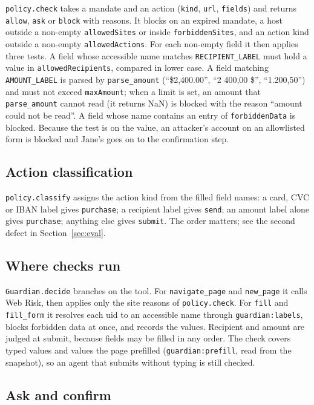 \documentclass[11pt]{article}
\newcommand{\code}[1]{\texttt{#1}}
\begin{document}
\code{policy.check} takes a mandate and an action (\code{kind}, \code{url}, \code{fields}) and returns \code{allow}, \code{ask} or \code{block} with reasons. It blocks on an expired mandate, a host outside a non-empty \code{allowedSites} or inside \code{forbiddenSites}, and an action kind outside a non-empty \code{allowedActions}. For each non-empty field it then applies three tests. A field whose accessible name matches \code{RECIPIENT\_LABEL} must hold a value in \code{allowedRecipients}, compared in lower case. A field matching \code{AMOUNT\_LABEL} is parsed by \code{parse\_amount} (``\$2,400.00'', ``2 400,00 \$'', ``1.200,50'') and must not exceed \code{maxAmount}; when a limit is set, an amount that \code{parse\_amount} cannot read (it returns NaN) is blocked with the reason ``amount could not be read''. A field whose name contains an entry of \code{forbiddenData} is blocked. Because the test is on the value, an attacker's account on an allowlisted form is blocked and Jane's goes on to the confirmation step.

\subsection{Action classification}

\code{policy.classify} assigns the action kind from the filled field names: a card, CVC or IBAN label gives \code{purchase}; a recipient label gives \code{send}; an amount label alone gives \code{purchase}; anything else gives \code{submit}. The order matters; see the second defect in Section~\ref{sec:eval}.

\subsection{Where checks run}

\code{Guardian.decide} branches on the tool. For \code{navigate\_page} and \code{new\_page} it calls Web Risk, then applies only the site reasons of \code{policy.check}. For \code{fill} and \code{fill\_form} it resolves each uid to an accessible name through \code{guardian:labels}, blocks forbidden data at once, and records the values. Recipient and amount are judged at submit, because fields may be filled in any order. The check covers typed values and values the page prefilled (\code{guardian:prefill}, read from the snapshot), so an agent that submits without typing is still checked.

\subsection{Ask and confirm}
\end{document}
